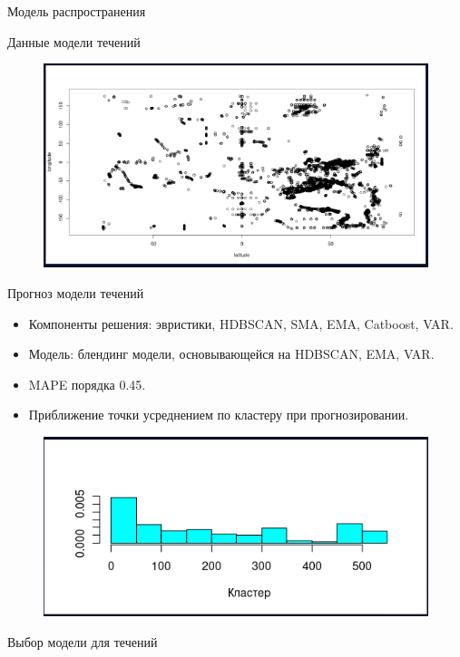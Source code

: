 \documentclass{beamer}
\begin{document}
\begin{section}{Модель распространения}
\begin{frame}{Данные модели течений}
\begin{figure}[H]
	\centering
	\includegraphics[scale=0.3]{scatter_plots_on_currents.png}
\end{figure}
\end{frame}

\begin{frame}{Прогноз модели течений}
\begin{itemize}
	\item Компоненты решения: эвристики, HDBSCAN, SMA, EMA, Catboost, VAR.
	\item Модель: блендинг модели, основывающейся на HDBSCAN, EMA, VAR.
	\item MAPE порядка 0.45.
	\item Приближение точки усреднением по кластеру при прогнозировании.
\end{itemize}

\begin{figure}[H]
	\centering
	\includegraphics[scale=0.3]{histogram_on_currents.png}
\end{figure}

\end{frame}

\begin{frame}{Выбор модели для течений}


\end{frame}
\end{section}
\end{document}
